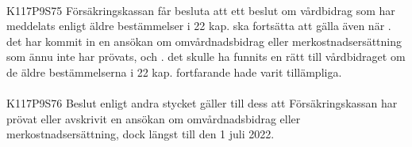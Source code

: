\documentclass[a4paper,notitlepage,openany,10pt]{book}
\begin{document}
\paragraph*{}
{\tiny K117P9S75}
Försäkringskassan får besluta att ett beslut om vårdbidrag som har meddelats enligt äldre bestämmelser i 22 kap. ska fortsätta att gälla även när
. det har kommit in en ansökan om omvårdnadsbidrag eller merkostnadsersättning som ännu inte har prövats, och
. det skulle ha funnits en rätt till vårdbidraget om de äldre bestämmelserna i 22 kap. fortfarande hade varit tillämpliga.
\paragraph*{}
{\tiny K117P9S76}
Beslut enligt andra stycket gäller till dess att Försäkringskassan har prövat eller avskrivit en ansökan om omvårdnadsbidrag eller merkostnadsersättning, dock längst till den 1 juli 2022.
\end{document}
